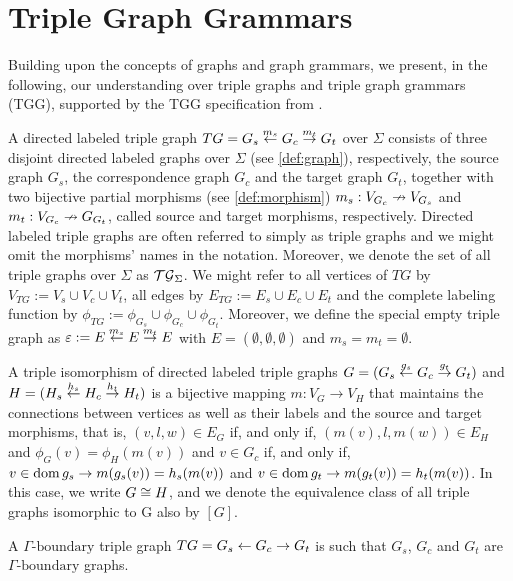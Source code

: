\section{Triple Graph Grammars}
Building upon the concepts of graphs and graph grammars, we present, in the following, our understanding over triple graphs and triple graph grammars (TGG), supported by the TGG specification from \cite{schurr1994specification}.


\begin{definition}
	A directed labeled triple graph $TG = G_s \overset{m_s}{\leftarrow} G_c \overset{m_t}{\rightarrow} G_t$ over $\Sigma$ consists of three disjoint directed labeled graphs over $\Sigma$ (see \ref{def:graph}), respectively, the source graph $G_s$, the correspondence graph $G_c$ and the target graph $G_t$, together with two bijective partial morphisms (see \ref{def:morphism}) $m_s: V_{G_c} \nrightarrow V_{G_s}$ and $m_t : V_{G_c} \nrightarrow G_{G_t}$, called source and target morphisms, respectively. Directed labeled triple graphs are often referred to simply as triple graphs and we might omit the morphisms' names in the notation. Moreover, we denote the set of all triple graphs over $\Sigma$ as $\mathcal{TG}_{\Sigma}$. We might refer to all vertices of $TG$ by $V_{TG}:= V_s \cup V_c \cup V_t$, all edges by $E_{TG}:= E_s \cup E_c \cup E_t$ and the complete labeling function by $\phi_{TG}:= \phi_{G_s} \cup \phi_{G_c} \cup \phi_{G_t}$.
	Moreover, we define the special empty triple graph as $\varepsilon := E \overset{m_s}{\leftarrow} E \overset{m_t}{\rightarrow} E$ with $E = (\emptyset, \emptyset, \emptyset)$ and $m_s = m_t = \emptyset$.
\end{definition}

\begin{definition}
	A triple isomorphism of directed labeled triple graphs $G = (G_s \overset{g_s}{\leftarrow} G_c \overset{g_t}{\rightarrow} G_t)$ and $H = (H_s \overset{h_s}{\leftarrow} H_c \overset{h_t}{\rightarrow} H_t)$ is a bijective mapping $m: V_G \to V_H$ that maintains the connections between vertices as well as their labels and the source and target morphisms, that is, $(v,l,w) \in E_G$ if, and only if, $(m(v),l,m(w)) \in E_H$ and $\phi_G(v) = \phi_H(m(v))$ and $v \in G_c$ if, and only if, $v \in \operatorname{dom} g_s \rightarrow m(g_s(v)) = h_s(m(v))$ and $v \in \operatorname{dom} g_t \rightarrow m(g_t(v)) = h_t(m(v))$. In this case, we write $G \cong H$, and we denote the equivalence class of all triple graphs isomorphic to G also by $[G]$.
\end{definition}

\begin{definition}
	A $\Gamma\text{-boundary}$ triple graph $TG = G_s \overset{}{\leftarrow} G_c \overset{}{\rightarrow} G_t$ is such that $G_s$, $G_c$ and $G_t$ are $\Gamma\text{-boundary}$ graphs.
\end{definition}

